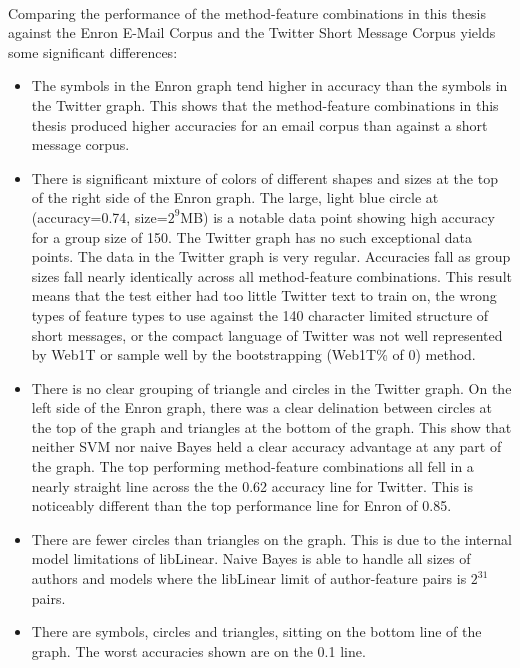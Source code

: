\paragraph*{} Comparing the performance of the method-feature combinations in this thesis against the Enron E-Mail Corpus and the Twitter Short Message Corpus yields some significant differences:
	\begin{itemize}
		\item The symbols in the Enron graph tend higher in accuracy than the symbols in the Twitter graph.  This shows that the method-feature combinations in this thesis produced higher accuracies for an email corpus than against a short message corpus.
		\item There is significant mixture of colors of different shapes and sizes at the top of the right side of the Enron graph.  The large, light blue circle  at (accuracy=0.74, size=$2^9$MB) is a notable data point showing high accuracy for a group size of 150.  The Twitter graph has no such exceptional data points.  The data in the Twitter graph is very regular.  Accuracies fall as group sizes fall nearly identically across all method-feature combinations.  This result means that the test either had too little Twitter text to train on, the wrong types of feature types to use against the 140 character limited structure of short messages, or the compact language of Twitter was not well represented by Web1T or sample well by the bootstrapping (Web1T\% of 0) method.
		\item There is no clear grouping of triangle and circles in the Twitter graph.  On the left side of the Enron graph, there was a clear delination between circles at the top of the graph and triangles at the bottom of the graph.  This show that neither SVM nor naive Bayes held a clear accuracy advantage at any part of the graph.  The top performing method-feature combinations all fell in a nearly straight line across the the 0.62 accuracy line for Twitter.  This is noticeably different than the top performance line for Enron of 0.85.


		\item There are fewer circles than triangles on the graph.  This is due to the internal model limitations of libLinear.  Naive Bayes is able to handle all sizes of authors and models where the libLinear limit of author-feature pairs is $2^31$ pairs.
		\item There are symbols, circles and triangles, sitting on the bottom line of the graph.  The worst accuracies shown are on the 0.1 line. 
	\end{itemize}

